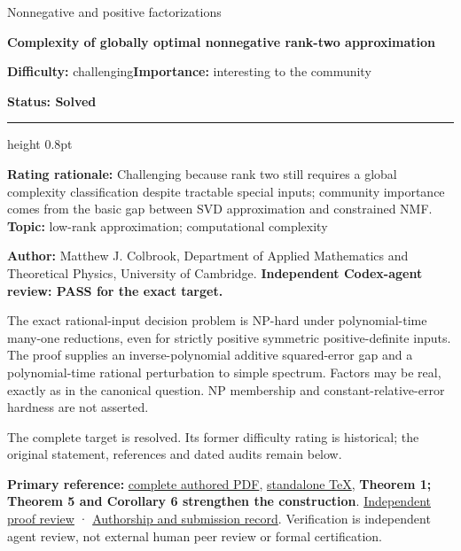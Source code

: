 \documentclass[11pt,a4paper]{article}
\makeatletter
\renewcommand{\subsection}{\Needspace{4\baselineskip}\@startsection{subsection}{2}{0pt}{9pt plus 1pt minus 1pt}{3pt}{\sffamily\bfseries\normalsize\color{ink}}}
\makeatother
\begin{document}
{\sffamily\small\color{muted}Nonnegative and positive
factorizations\par}
\vspace{3pt}
{\raggedright{}\sffamily\bfseries\fontsize{21}{24}\selectfont\color{ink}Complexity
of globally optimal nonnegative rank-two approximation\par}
\vspace{7pt}
{\sffamily\small\textbf{Difficulty:} challenging\quad\textbf{Importance:} interesting
to the community\par}
{\sffamily\small\bfseries\color{accent}Status: Solved\par}
\vspace{4pt}
{\color{accent}\hrule height 0.8pt}
\vspace{6pt}
\textbf{Rating rationale:} Challenging because rank two still requires a
global complexity classification despite tractable special inputs;
community importance comes from the basic gap between SVD approximation
and constrained NMF.\\
\textbf{Topic:} low-rank approximation; computational complexity

\subsection{Resolution --- 2026-09-11}\label{resolution-2026-09-11}

\textbf{Author:} Matthew J. Colbrook, Department of Applied Mathematics
and Theoretical Physics, University of Cambridge. \textbf{Independent
Codex-agent review: PASS for the exact target.}

The exact rational-input decision problem is NP-hard under
polynomial-time many-one reductions, even for strictly positive
symmetric positive-definite inputs. The proof supplies an
inverse-polynomial additive squared-error gap and a polynomial-time
rational perturbation to simple spectrum. Factors may be real, exactly
as in the canonical question. NP membership and constant-relative-error
hardness are not asserted.

The complete target is resolved. Its former difficulty rating is
historical; the original statement, references and dated audits remain
below.

\textbf{Primary reference:}
\href{https://github.com/ajt60gaibb/OpenProblemsInNLA/blob/main/references/colbrook-factorization-2026-09-11/manuscripts/NM-03_rank_two_approximation_hardness.pdf}{complete
authored PDF},
\href{https://github.com/ajt60gaibb/OpenProblemsInNLA/blob/main/references/colbrook-factorization-2026-09-11/manuscripts/NM-03_rank_two_approximation_hardness.tex}{standalone
TeX}, \textbf{Theorem 1; Theorem 5 and Corollary 6 strengthen the
construction}.
\href{https://github.com/ajt60gaibb/OpenProblemsInNLA/blob/main/references/colbrook-factorization-2026-09-11/verification/reviews/NM-03-review.md}{Independent
proof review} ·
\href{https://github.com/ajt60gaibb/OpenProblemsInNLA/blob/main/references/colbrook-factorization-2026-09-11/README.md}{Authorship
and submission record}. Verification is independent agent review, not
external human peer review or formal certification.
\end{document}
